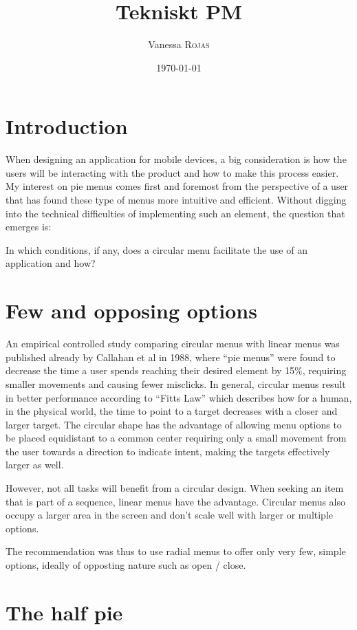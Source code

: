 \documentclass{article}
\title{Tekniskt PM}
\author{Vanessa \textsc{Rojas}}
\date{\today}
\begin{document}
\maketitle
\section{Introduction}
When designing an application for mobile devices, a big consideration is how the users will be interacting with the product and how to make this process easier. My interest on pie menus comes first and foremost from the perspective of a user that has found these type of menus more intuitive and efficient. Without digging into the technical difficulties of implementing such an element, the question that emerges is:


In which conditions, if any, does a circular menu facilitate the use of an application and how?


\section{Few and opposing options}


An empirical controlled study comparing circular menus with linear menus was published already by Callahan et al in 1988, where ``pie menus'' were found to decrease the time a user spends reaching their desired element by 15\%, requiring smaller movements and causing fewer misclicks. In general, circular menus result in better performance according to ``Fitts Law'' which describes how for a human, in the physical world, the time to point to a target decreases with a closer and larger target. The circular shape has the advantage of allowing menu options to be placed equidistant to a common center requiring only a small movement from the user towards a direction to indicate intent, making the targets effectively larger as well.

However, not all tasks will benefit from a circular design. When seeking an item that is part of a sequence, linear menus have the advantage. Circular menus also occupy a larger area in the screen and don't scale well with larger or multiple options. 

The recommendation was thus to use radial menus to offer only very few, simple options, ideally of opposting nature such as open / close.

\section{The half pie}
\end{document}
